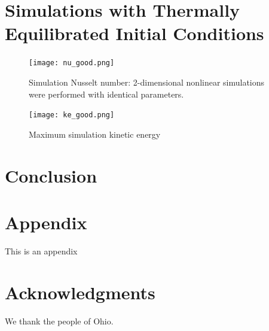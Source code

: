 \documentclass[reprint,amsmath,amssymb,aps]{revtex4-1}
\begin{document}
 \newpage
\section{Simulations with Thermally Equilibrated Initial Conditions}

\begin{figure}[h]
    \centering
    \texttt{[image: nu\_good.png]}
    \caption{Simulation Nusselt number: 2-dimensional nonlinear simulations were performed with identical parameters.}
    \label{fig:my_label}
\end{figure}

\begin{figure}[h]
    \centering
    \texttt{[image: ke\_good.png]}
    \caption{Maximum simulation kinetic energy}
    \label{fig:my_label}
\end{figure}


\section{Conclusion}\label{sec:conclusion}

\section*{Appendix}
This is an appendix

\section*{Acknowledgments}
We thank the people of Ohio.


\end{document}
